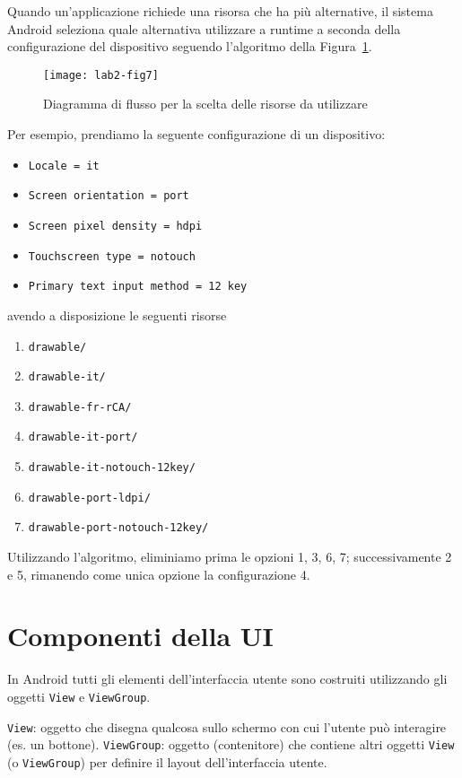 Quando un'applicazione richiede una risorsa che ha più alternative, il sistema Android seleziona quale alternativa utilizzare a runtime a seconda della configurazione del dispositivo seguendo l'algoritmo della Figura~\ref{img:lab2-fig7}.

\begin{figure}[h]
	\centering
	\texttt{[image: lab2-fig7]}
	\caption[Flowchart Risorse]{Diagramma di flusso per la scelta delle risorse da utilizzare}\label{img:lab2-fig7}
\end{figure}

Per esempio, prendiamo la seguente configurazione di un dispositivo:
\begin{itemize}
\item \texttt{Locale = it}
\item \texttt{Screen orientation = port}
\item \texttt{Screen pixel density = hdpi}
\item \texttt{Touchscreen type = notouch}
\item \texttt{Primary text input method = 12 key}
\end{itemize}

avendo a disposizione le seguenti risorse

\begin{enumerate}
\item \texttt{drawable/}
\item \texttt{drawable-it/}
\item \texttt{drawable-fr-rCA/}
\item \texttt{drawable-it-port/}
\item \texttt{drawable-it-notouch-12key/}
\item \texttt{drawable-port-ldpi/}
\item \texttt{drawable-port-notouch-12key/}
\end{enumerate}

Utilizzando l'algoritmo, eliminiamo prima le opzioni 1, 3, 6, 7; successivamente 2 e 5, rimanendo come unica opzione la configurazione 4.

\section{Componenti della UI}

In Android tutti gli elementi dell'interfaccia utente sono costruiti utilizzando gli oggetti \texttt{View} e \texttt{ViewGroup}.

\texttt{View}: oggetto che disegna qualcosa sullo schermo con cui l'utente può interagire (es. un bottone).
\texttt{ViewGroup}: oggetto (contenitore) che contiene altri oggetti \texttt{View} (o \texttt{ViewGroup}) per definire il layout dell'interfaccia utente.

